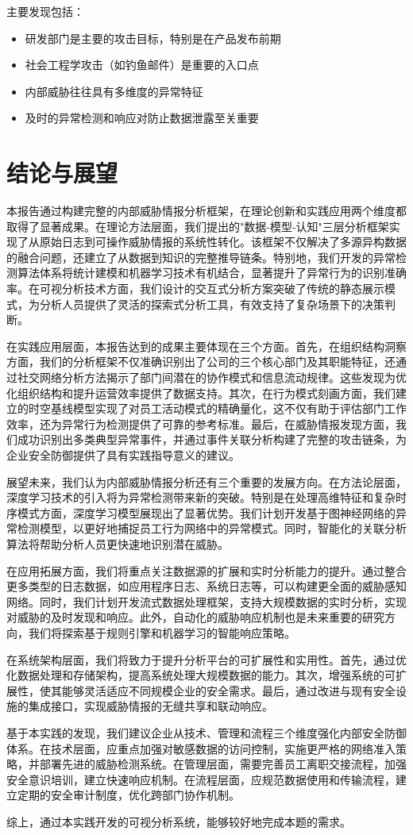 \documentclass[UTF8,12pt]{ctexart}
\begin{document}
主要发现包括：
\begin{itemize}
    \item 研发部门是主要的攻击目标，特别是在产品发布前期
    \item 社会工程学攻击（如钓鱼邮件）是重要的入口点
    \item 内部威胁往往具有多维度的异常特征
    \item 及时的异常检测和响应对防止数据泄露至关重要
\end{itemize}

\section{结论与展望}
本报告通过构建完整的内部威胁情报分析框架，在理论创新和实践应用两个维度都取得了显著成果。在理论方法层面，我们提出的"数据-模型-认知"三层分析框架实现了从原始日志到可操作威胁情报的系统性转化。该框架不仅解决了多源异构数据的融合问题，还建立了从数据到知识的完整推导链条。特别地，我们开发的异常检测算法体系将统计建模和机器学习技术有机结合，显著提升了异常行为的识别准确率。在可视分析技术方面，我们设计的交互式分析方案突破了传统的静态展示模式，为分析人员提供了灵活的探索式分析工具，有效支持了复杂场景下的决策判断。

在实践应用层面，本报告达到的成果主要体现在三个方面。首先，在组织结构洞察方面，我们的分析框架不仅准确识别出了公司的三个核心部门及其职能特征，还通过社交网络分析方法揭示了部门间潜在的协作模式和信息流动规律。这些发现为优化组织结构和提升运营效率提供了数据支持。其次，在行为模式刻画方面，我们建立的时空基线模型实现了对员工活动模式的精确量化，这不仅有助于评估部门工作效率，还为异常行为检测提供了可靠的参考标准。最后，在威胁情报发现方面，我们成功识别出多类典型异常事件，并通过事件关联分析构建了完整的攻击链条，为企业安全防御提供了具有实践指导意义的建议。

展望未来，我们认为内部威胁情报分析还有三个重要的发展方向。在方法论层面，深度学习技术的引入将为异常检测带来新的突破。特别是在处理高维特征和复杂时序模式方面，深度学习模型展现出了显著优势。我们计划开发基于图神经网络的异常检测模型，以更好地捕捉员工行为网络中的异常模式。同时，智能化的关联分析算法将帮助分析人员更快速地识别潜在威胁。

在应用拓展方面，我们将重点关注数据源的扩展和实时分析能力的提升。通过整合更多类型的日志数据，如应用程序日志、系统日志等，可以构建更全面的威胁感知网络。同时，我们计划开发流式数据处理框架，支持大规模数据的实时分析，实现对威胁的及时发现和响应。此外，自动化的威胁响应机制也是未来重要的研究方向，我们将探索基于规则引擎和机器学习的智能响应策略。

在系统架构层面，我们将致力于提升分析平台的可扩展性和实用性。首先，通过优化数据处理和存储架构，提高系统处理大规模数据的能力。其次，增强系统的可扩展性，使其能够灵活适应不同规模企业的安全需求。最后，通过改进与现有安全设施的集成接口，实现威胁情报的无缝共享和联动响应。

基于本实践的发现，我们建议企业从技术、管理和流程三个维度强化内部安全防御体系。在技术层面，应重点加强对敏感数据的访问控制，实施更严格的网络准入策略，并部署先进的威胁检测系统。在管理层面，需要完善员工离职交接流程，加强安全意识培训，建立快速响应机制。在流程层面，应规范数据使用和传输流程，建立定期的安全审计制度，优化跨部门协作机制。

综上，通过本实践开发的可视分析系统，能够较好地完成本题的需求。
\end{document}

